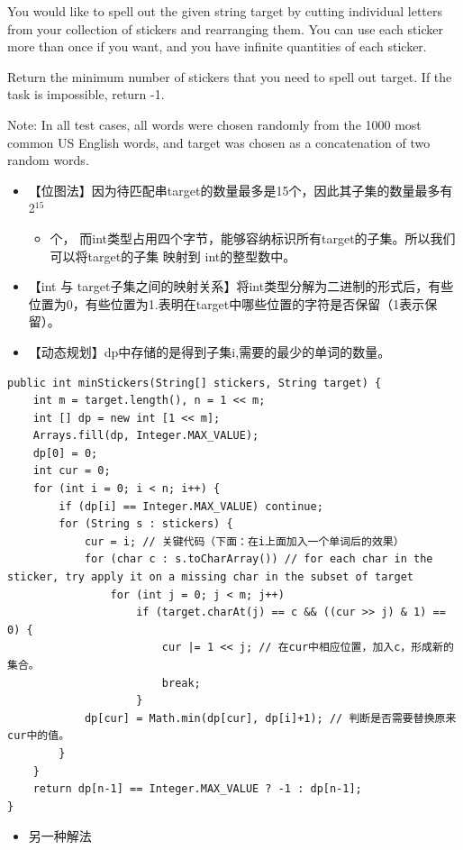\documentclass[9pt, b5paaper]{book}
\begin{document}
You would like to spell out the given string target by cutting individual letters from your collection of stickers and rearranging them. You can use each sticker more than once if you want, and you have infinite quantities of each sticker.

Return the minimum number of stickers that you need to spell out target. If the task is impossible, return -1.

Note: In all test cases, all words were chosen randomly from the 1000 most common US English words, and target was chosen as a concatenation of two random words.
\begin{itemize}
\item 【位图法】因为待匹配串target的数量最多是15个，因此其子集的数量最多有 2$^{\text{15}}$ 
\begin{itemize}
\item 个， 而int类型占用四个字节，能够容纳标识所有target的子集。所以我们可以将target的子集 映射到 int的整型数中。
\end{itemize}
\item 【int 与 target子集之间的映射关系】将int类型分解为二进制的形式后，有些位置为0，有些位置为1.表明在target中哪些位置的字符是否保留（1表示保留）。
\item 【动态规划】dp中存储的是得到子集i,需要的最少的单词的数量。
\end{itemize}
\begin{verbatim}
public int minStickers(String[] stickers, String target) {
    int m = target.length(), n = 1 << m;
    int [] dp = new int [1 << m];
    Arrays.fill(dp, Integer.MAX_VALUE);
    dp[0] = 0;
    int cur = 0;
    for (int i = 0; i < n; i++) {
        if (dp[i] == Integer.MAX_VALUE) continue;
        for (String s : stickers) {
            cur = i; // 关键代码（下面：在i上面加入一个单词后的效果）
            for (char c : s.toCharArray()) // for each char in the sticker, try apply it on a missing char in the subset of target
                for (int j = 0; j < m; j++) 
                    if (target.charAt(j) == c && ((cur >> j) & 1) == 0) {
                        cur |= 1 << j; // 在cur中相应位置，加入c，形成新的集合。
                        break;
                    }
            dp[cur] = Math.min(dp[cur], dp[i]+1); // 判断是否需要替换原来cur中的值。
        }
    }
    return dp[n-1] == Integer.MAX_VALUE ? -1 : dp[n-1];
}
\end{verbatim}
\begin{itemize}
\item 另一种解法
\end{itemize}
\end{document}
